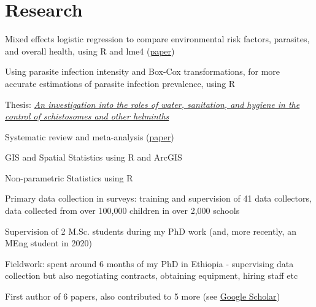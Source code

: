 \documentclass[]{cv-template}
\begin{document}
\begin{minipage}[t]{0.66\textwidth}
\section{Research}
\begin{tightemize}
\item Mixed effects logistic regression to compare environmental risk factors, parasites, and overall health, using R and lme4 (\href{https://journals.plos.org/plosntds/article?id=10.1371/journal.pntd.0005948}{paper})
\item Using parasite infection intensity and Box-Cox transformations, for more accurate estimations of parasite infection prevalence, using R
\end{tightemize}
\sectionsep


Thesis: {\href{https://spiral.imperial.ac.uk/handle/10044/1/44497}{\textit{An investigation into the roles of water, sanitation, and hygiene in the control of schistosomes and other helminths}}}
\begin{tightemize}
\item Systematic review and meta-analysis (\href{https://journals.plos.org/plosntds/article?id=10.1371/journal.pntd.0003296}{paper})
\item GIS and Spatial Statistics using R and ArcGIS
\item Non-parametric Statistics using R
\item Primary data collection in surveys: training and supervision of 41 data collectors, data collected from over 100,000 children in over 2,000 schools
\item Supervision of 2 M.Sc. students during my PhD work (and, more recently, an MEng student in 2020)
\item Fieldwork: spent around 6 months of my PhD in Ethiopia - supervising data collection but also negotiating contracts, obtaining equipment, hiring staff etc
\item First author of 6 papers, also contributed to 5 more (see \href{https://scholar.google.co.uk/citations?hl=en&user=HZLogpQAAAAJ}{Google Scholar})
\end{tightemize}
\sectionsep


\end{minipage}
\end{document}
